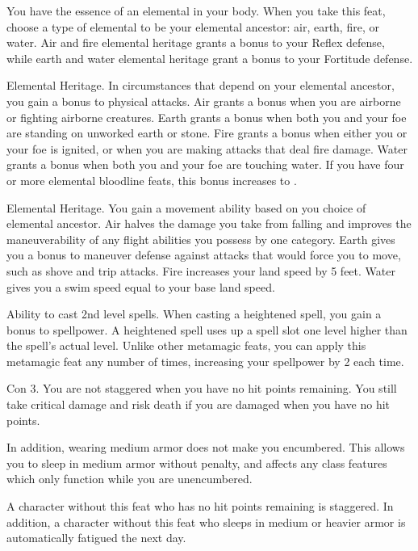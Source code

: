 \featben You have the essence of an elemental in your body.
When you take this feat, choose a type of elemental to be your elemental ancestor: air, earth, fire, or water.
Air and fire elemental heritage grants a  bonus to your Reflex defense, while earth and water elemental heritage grant a  bonus to your Fortitude defense.

\featpre Elemental Heritage.
\featben In circumstances that depend on your elemental ancestor, you gain a  bonus to physical attacks.
Air grants a bonus when you are airborne or fighting airborne creatures.
Earth grants a bonus when both you and your foe are standing on unworked earth or stone.
Fire grants a bonus when either you or your foe is ignited, or when you are making attacks that deal fire damage.
Water grants a bonus when both you and your foe are touching water.
If you have four or more elemental bloodline feats, this bonus increases to .

\featpre Elemental Heritage.
\featben You gain a movement ability based on you choice of elemental ancestor.
Air halves the damage you take from falling and improves the maneuverability of any flight abilities you possess by one category.
Earth gives you a  bonus to maneuver defense against attacks that would force you to move, such as shove and trip attacks.
Fire increases your land speed by 5 feet.
Water gives you a swim speed equal to your base land speed.

\featpre Ability to cast 2nd level spells.
\featben When casting a heightened spell, you gain a  bonus to spellpower.
A heightened spell uses up a spell slot one level higher than the spell's actual level.
Unlike other metamagic feats, you can apply this metamagic feat any number of times, increasing your spellpower by 2 each time.

\featpre Con 3.
\featben You are not staggered when you have no hit points remaining.
You still take critical damage and risk death if you are damaged when you have no hit points.

In addition, wearing medium armor does not make you encumbered.
This allows you to sleep in medium armor without penalty, and affects any class features which only function while you are unencumbered.

A character without this feat who has no hit points remaining is staggered.
In addition, a character without this feat who sleeps in medium or heavier armor is automatically fatigued the next day.

